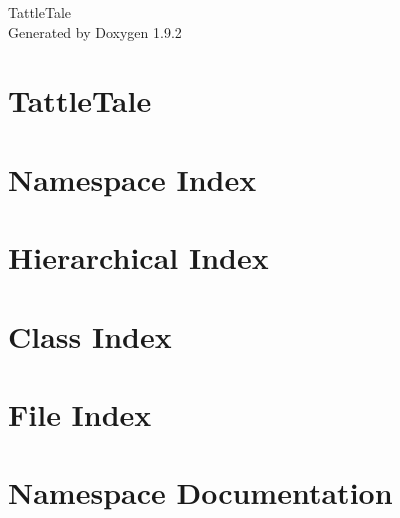 \documentclass[twoside]{book}
\newcommand{\+}{\discretionary{\mbox{\scriptsize$\hookleftarrow$}}{}{}}
\newcommand{\clearemptydoublepage}{%
    \newpage{\pagestyle{empty}\cleardoublepage}%
  }
\begin{document}
  \raggedbottom
    \hypersetup{pageanchor=false,
                bookmarksnumbered=true,
                pdfencoding=unicode
               }
  \begin{titlepage}
  \vspace*{7cm}
  \begin{center}%
  {\Large Tattle\+Tale}\\
  \vspace*{1cm}
  {\large Generated by Doxygen 1.9.2}\\
  \end{center}
  \end{titlepage}
  \clearemptydoublepage
  \tableofcontents
  \clearemptydoublepage
  \hypersetup{pageanchor=true}
\chapter{Tattle\+Tale}
\label{index}\hypertarget{index}{}
\chapter{Namespace Index}

\chapter{Hierarchical Index}

\chapter{Class Index}

\chapter{File Index}

\chapter{Namespace Documentation}

\end{document}
